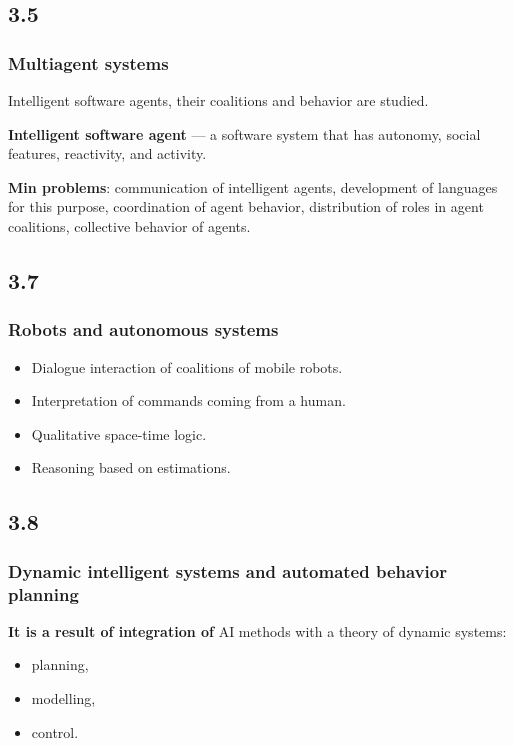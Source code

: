 \documentclass[default]{beamer}
\begin{document}
	\subsection{3.5}
	\begin{frame}
		\frametitle{Multiagent systems}
		
		Intelligent software agents, their coalitions and behavior are studied.
		
		\par\medskip
		\textbf{Intelligent software agent} --- a software system that has autonomy, social features, reactivity, and activity.
		
		\par\medskip
		\textbf{Min problems}: communication of intelligent agents, development of languages for this purpose, coordination of agent behavior, distribution of roles in agent coalitions, collective behavior of agents.
	\end{frame}

	\subsection{3.7}
	\begin{frame}
		\frametitle{Robots and autonomous systems}
		\Large
		\begin{itemize}
			\item Dialogue interaction of coalitions of mobile robots.
			\item Interpretation of commands coming from a human.
			
			\item Qualitative space-time logic.
			
			\item Reasoning based on estimations.
			
		\end{itemize}
		
	\end{frame}

	\subsection{3.8}
	\begin{frame}
		\frametitle{Dynamic intelligent systems and automated behavior planning}
		\Large
		
		\textbf{It is a result of integration of } AI methods with a theory of dynamic systems:
		\begin{itemize}
			\item planning,
			\item modelling,
			\item control.
		\end{itemize}
		
	\end{frame}
\end{document}
